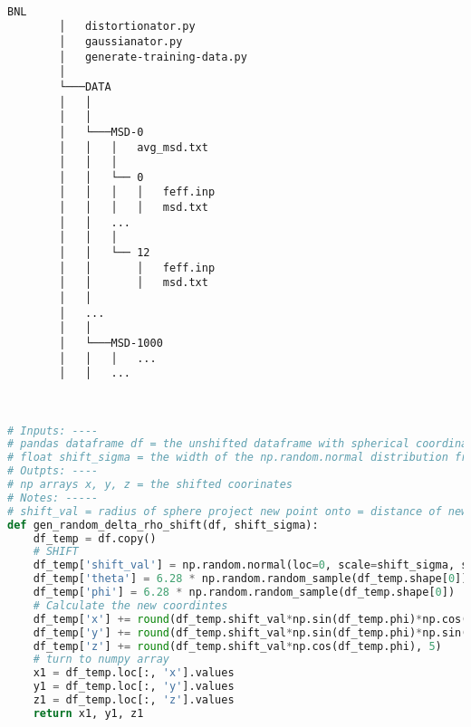\begin{minipage}{\linewidth}
    ~ \\
    \begin{Verbatim}[samepage=false]
        BNL
        │   distortionator.py
        │   gaussianator.py
        │   generate-training-data.py
        │       
        └───DATA
        │   │       
        │   │
        │   └───MSD-0
        │   │   │   avg_msd.txt
        │   │   │
        │   │   └── 0
        │   │   │   │   feff.inp
        │   │   │   │   msd.txt
        │   │   ...
        │   │   │
        │   │   └── 12
        │   │       │   feff.inp
        │   │       │   msd.txt
        │   │       
        │   ...
        │   │
        │   └───MSD-1000
        │   │   │   ...
        │   │   ...

    \end{Verbatim}
    ~
    \end{minipage}

\pagebreak
\begin{lstlisting}[language=Python]
# Inputs: ----
# pandas dataframe df = the unshifted dataframe with spherical coordinates
# float shift_sigma = the width of the np.random.normal distribution from which shift distances are chosen
# Outpts: ----
# np arrays x, y, z = the shifted coorinates
# Notes: -----
# shift_val = radius of sphere project new point onto = distance of new disordered atom from original location
def gen_random_delta_rho_shift(df, shift_sigma):
    df_temp = df.copy()
    # SHIFT
    df_temp['shift_val'] = np.random.normal(loc=0, scale=shift_sigma, size=df_temp.shape[0])
    df_temp['theta'] = 6.28 * np.random.random_sample(df_temp.shape[0])
    df_temp['phi'] = 6.28 * np.random.random_sample(df_temp.shape[0])
    # Calculate the new coordintes
    df_temp['x'] += round(df_temp.shift_val*np.sin(df_temp.phi)*np.cos(df_temp.theta), 5)
    df_temp['y'] += round(df_temp.shift_val*np.sin(df_temp.phi)*np.sin(df_temp.theta), 5)
    df_temp['z'] += round(df_temp.shift_val*np.cos(df_temp.phi), 5)
    # turn to numpy array
    x1 = df_temp.loc[:, 'x'].values
    y1 = df_temp.loc[:, 'y'].values
    z1 = df_temp.loc[:, 'z'].values
    return x1, y1, z1
\end{lstlisting}

